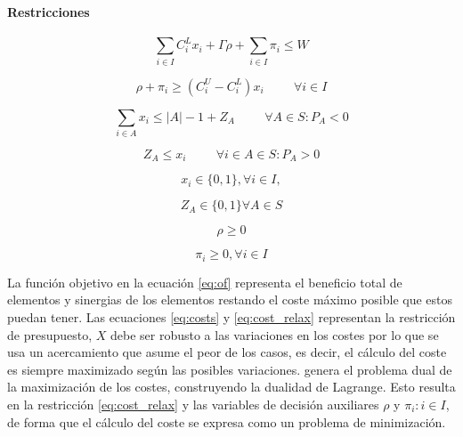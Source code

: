 \documentclass[spanish, a4paper, 12pt, openany,final]{book}
\begin{document}
    \paragraph*{Restricciones}
    
    \begin{equation}
   		\label{eq:costs}
  		\sum_{i\in I}{C^L_ix_i} + \Gamma\rho+\sum_{i \in I} \pi_i \leq W
    \end{equation}
    
    \begin{equation}
    	\label{eq:cost_relax}
    	\rho + \pi_i \geq \left(C^U_i - C^L_i\right)x_i 
    	\hspace{1cm}
    	 \forall i \in I
    \end{equation}
    
    \begin{equation}
    	\label{eq:fijar_z}
    	\sum_{i\in A} x_i \leq |A| - 1 + Z_{A} \hspace{1cm} \forall A \in S:P_A < 0
    \end{equation}
   
    \begin{equation}
    	\label{eq:fijar_z_2}
    	Z_{A} \leq x_i \hspace{1cm} \forall i \in A \in S: P_A > 0
    \end{equation}
    
    \begin{equation}
    	x_i \in \{0,1\},
    	\forall i \in I,
    \end{equation}
    
    \begin{equation}
    	Z_{A} \in \{0,1\} \forall A \in S
    \end{equation}
    
    \begin{equation}
    	\rho \geq 0
    \end{equation}
    
    \begin{equation}
    	\pi_i \geq 0, \forall i \in I
    \end{equation}
    
    
    La función objetivo en la ecuación \eqref{eq:of} representa el beneficio total de elementos y sinergias de los elementos restando el coste máximo posible que estos puedan tener. Las ecuaciones \eqref{eq:costs} y \eqref{eq:cost_relax} representan la restricción de presupuesto, $X$ debe ser robusto a las variaciones en los costes por lo que se usa un acercamiento que asume el peor de los casos, es decir, el cálculo del coste es siempre maximizado según las posibles variaciones. \cite{baldo_polynomial_2023} genera el problema dual de la maximización de los costes, construyendo la dualidad de Lagrange. Esto resulta en la restricción \ref{eq:cost_relax} y las variables de decisión auxiliares $\rho$ y $\pi_i: i \in I$, de forma que el cálculo del coste se expresa como un problema de minimización.
    
\end{document}
